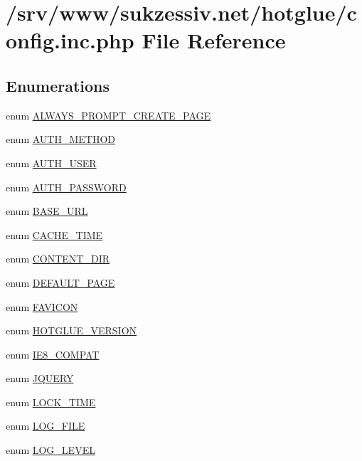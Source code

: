\hypertarget{config_8inc_8php}{
\section{/srv/www/sukzessiv.net/hotglue/config.inc.php File Reference}
\label{config_8inc_8php}
}
\subsection*{Enumerations}
\begin{DoxyCompactItemize}
\item 
enum \hyperlink{config_8inc_8php_af7115c186e2e18cb1839aed9d163b31a}{ALWAYS\_\-PROMPT\_\-CREATE\_\-PAGE} 
\item 
enum \hyperlink{config_8inc_8php_a2ee7e30fa45253c5e303994703d3293f}{AUTH\_\-METHOD} 
\item 
enum \hyperlink{config_8inc_8php_a7d3a74ff015a9f789a5a2e554a9fa956}{AUTH\_\-USER} 
\item 
enum \hyperlink{config_8inc_8php_adf2112da607b39714ba9cca31b42a93a}{AUTH\_\-PASSWORD} 
\item 
enum \hyperlink{config_8inc_8php_a16548ab75ed30cbddce178d56d26dbb8}{BASE\_\-URL} 
\item 
enum \hyperlink{config_8inc_8php_afc454c0433a87811735836800fe3350b}{CACHE\_\-TIME} 
\item 
enum \hyperlink{config_8inc_8php_a9949c9013641bf07cd112607d200d6ff}{CONTENT\_\-DIR} 
\item 
enum \hyperlink{config_8inc_8php_a4208e17d37801abf0982b2d1e625a8f2}{DEFAULT\_\-PAGE} 
\item 
enum \hyperlink{config_8inc_8php_afd55d95ee6651060397404533516882a}{FAVICON} 
\item 
enum \hyperlink{config_8inc_8php_a7c35565a4692ae46fd1c04340f4f1ca9}{HOTGLUE\_\-VERSION} 
\item 
enum \hyperlink{config_8inc_8php_a1d76a949b348522c90864da5df468d51}{IE8\_\-COMPAT} 
\item 
enum \hyperlink{config_8inc_8php_a5c2fff7e41a0380fb7872627e3a14a29}{JQUERY} 
\item 
enum \hyperlink{config_8inc_8php_a924ae40271cc363050158e36b3823407}{LOCK\_\-TIME} 
\item 
enum \hyperlink{config_8inc_8php_a6de83433b64b24349644a4c2d839dcb7}{LOG\_\-FILE} 
\item 
enum \hyperlink{config_8inc_8php_aa5a9053636a30269210c54e734e0d583}{LOG\_\-LEVEL} 

\end{DoxyCompactItemize}
